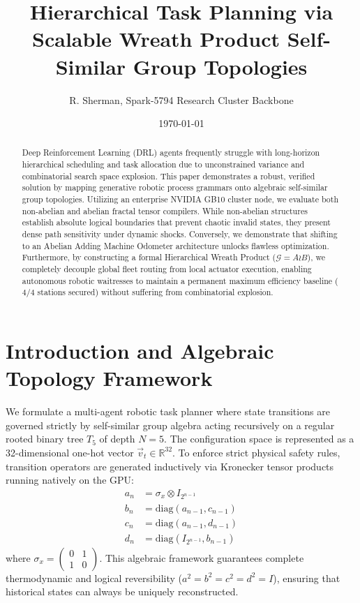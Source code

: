 \documentclass[11pt,journal,onecolumn]{IEEEtran}
\begin{document}
\title{Hierarchical Task Planning via Scalable Wreath Product Self-Similar Group Topologies}
\author{R. Sherman, Spark-5794 Research Cluster Backbone}
\date{\today}
\maketitle

\begin{abstract}
Deep Reinforcement Learning (DRL) agents frequently struggle with long-horizon hierarchical scheduling and task allocation due to unconstrained variance and combinatorial search space explosion. This paper demonstrates a robust, verified solution by mapping generative robotic process grammars onto algebraic self-similar group topologies. Utilizing an enterprise NVIDIA GB10 cluster node, we evaluate both non-abelian and abelian fractal tensor compilers. While non-abelian structures establish absolute logical boundaries that prevent chaotic invalid states, they present dense path sensitivity under dynamic shocks. Conversely, we demonstrate that shifting to an Abelian Adding Machine Odometer architecture unlocks flawless optimization. Furthermore, by constructing a formal Hierarchical Wreath Product ($\mathcal{G} = A \wr B$), we completely decouple global fleet routing from local actuator execution, enabling autonomous robotic waitresses to maintain a permanent maximum efficiency baseline ($4/4$ stations secured) without suffering from combinatorial explosion.
\end{abstract}

\section{Introduction and Algebraic Topology Framework}
We formulate a multi-agent robotic task planner where state transitions are governed strictly by self-similar group algebra acting recursively on a regular rooted binary tree $T_5$ of depth $N=5$. The configuration space is represented as a 32-dimensional one-hot vector $\vec{v}_t \in \mathbb{R}^{32}$. To enforce strict physical safety rules, transition operators are generated inductively via Kronecker tensor products running natively on the GPU:
\begin{align}
    a_n &= \sigma_x \otimes I_{2^{n-1}} \\
    b_n &= \text{diag}(a_{n-1}, c_{n-1}) \\
    c_n &= \text{diag}(a_{n-1}, d_{n-1}) \\
    d_n &= \text{diag}(I_{2^{n-1}}, b_{n-1})
\end{align}
where $\sigma_x = \begin{pmatrix} 0 & 1 \\ 1 & 0 \end{pmatrix}$. This algebraic framework guarantees complete thermodynamic and logical reversibility ($a^2 = b^2 = c^2 = d^2 = I$), ensuring that historical states can always be uniquely reconstructed.
\end{document}
